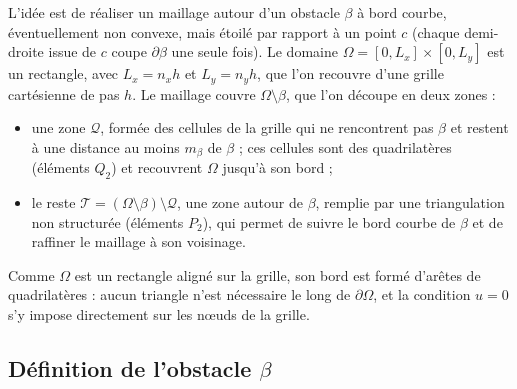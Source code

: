 \documentclass[11pt,a4paper]{article}
\begin{document}
L'idée est de réaliser un maillage autour d'un obstacle $\beta$ à bord
courbe, éventuellement non convexe, mais étoilé par rapport à un point $c$
(chaque demi-droite issue de $c$ coupe $\partial\beta$ une seule fois). Le
domaine $\Omega = [0, L_x] \times [0, L_y]$ est un rectangle, avec
$L_x = n_x h$ et $L_y = n_y h$, que l'on recouvre d'une grille cartésienne de
pas $h$. Le maillage couvre $\Omega \setminus \beta$, que l'on découpe en deux
zones :
\begin{itemize}
  \item une zone $\mathcal{Q}$, formée des cellules de la grille qui ne
        rencontrent pas $\beta$ et restent à une distance au moins $m_\beta$
        de $\beta$ ; ces cellules sont des quadrilatères (éléments $Q_2$) et
        recouvrent $\Omega$ jusqu'à son bord ;
  \item le reste $\mathcal{T} = (\Omega \setminus \beta) \setminus \mathcal{Q}$,
        une zone autour de $\beta$, remplie par une triangulation non
        structurée (éléments $P_2$), qui permet de suivre le bord courbe de
        $\beta$ et de raffiner le maillage à son voisinage.
\end{itemize}

Comme $\Omega$ est un rectangle aligné sur la grille, son bord est formé
d'arêtes de quadrilatères : aucun triangle n'est nécessaire le long de
$\partial\Omega$, et la condition $u = 0$ s'y impose directement sur les
nœuds de la grille.

\subsection{Définition de l'obstacle $\beta$}
\label{sec:beta}
\end{document}
